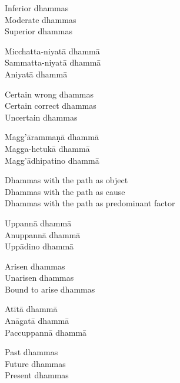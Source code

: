 \begin{english-verses}
  Inferior dhammas\\
  Moderate dhammas\\
  Superior dhammas
\end{english-verses}

\begin{pali-hang-continued}
  Micchatta-niyatā dhammā\\
  Sammatta-niyatā dhammā\\
  Aniyatā dhammā
\end{pali-hang-continued}

\begin{english-verses}
  Certain wrong dhammas\\
  Certain correct dhammas\\
  Uncertain dhammas
\end{english-verses}

\begin{pali-hang-continued}
  Magg'ārammaṇā dhammā\\
  Magga-hetukā dhammā\\
  Magg'ādhipatino dhammā
\end{pali-hang-continued}

\begin{english-verses}
  Dhammas with the path as object\\
  Dhammas with the path as cause\\
  Dhammas with the path as predominant factor
\end{english-verses}

\begin{pali-hang-continued}
  Uppannā dhammā\\
  Anuppannā dhammā\\
  Uppādino dhammā
\end{pali-hang-continued}

\begin{english-verses}
  Arisen dhammas\\
  Unarisen dhammas\\
  Bound to arise dhammas
\end{english-verses}

\begin{pali-hang-continued}
  Atītā dhammā\\
  Anāgatā dhammā\\
  Paccuppannā dhammā
\end{pali-hang-continued}

\begin{english-verses}
  Past dhammas\\
  Future dhammas\\
  Present dhammas
\end{english-verses}


